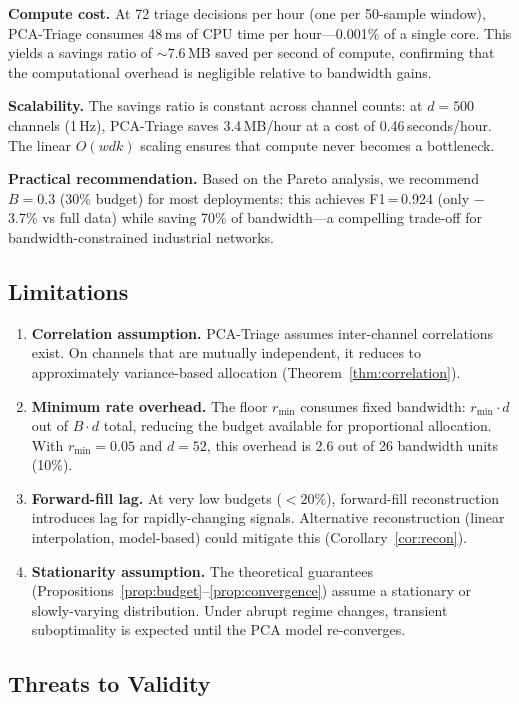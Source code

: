\documentclass[journal]{IEEEtran}
\begin{document}
\textbf{Compute cost.} At 72 triage decisions per hour (one per 50-sample window), PCA-Triage consumes 48\,ms of CPU time per hour---0.001\% of a single core. This yields a savings ratio of ${\sim}7.6$\,MB saved per second of compute, confirming that the computational overhead is negligible relative to bandwidth gains.

\textbf{Scalability.} The savings ratio is constant across channel counts: at $d{=}500$ channels (1\,Hz), PCA-Triage saves 3.4\,MB/hour at a cost of 0.46\,seconds/hour. The linear $O(wdk)$ scaling ensures that compute never becomes a bottleneck.

\textbf{Practical recommendation.} Based on the Pareto analysis, we recommend $B{=}0.3$ (30\% budget) for most deployments: this achieves F1\,=\,0.924 (only $-$3.7\% vs full data) while saving 70\% of bandwidth---a compelling trade-off for bandwidth-constrained industrial networks.

\subsection{Limitations}

\begin{enumerate}[leftmargin=*]
\item \textbf{Correlation assumption.} PCA-Triage assumes inter-channel correlations exist. On channels that are mutually independent, it reduces to approximately variance-based allocation (Theorem~\ref{thm:correlation}).
\item \textbf{Minimum rate overhead.} The floor $r_{\min}$ consumes fixed bandwidth: $r_{\min} \cdot d$ out of $B \cdot d$ total, reducing the budget available for proportional allocation. With $r_{\min} = 0.05$ and $d = 52$, this overhead is 2.6 out of 26 bandwidth units (10\%).
\item \textbf{Forward-fill lag.} At very low budgets ($< 20\%$), forward-fill reconstruction introduces lag for rapidly-changing signals. Alternative reconstruction (linear interpolation, model-based) could mitigate this (Corollary~\ref{cor:recon}).
\item \textbf{Stationarity assumption.} The theoretical guarantees (Propositions~\ref{prop:budget}--\ref{prop:convergence}) assume a stationary or slowly-varying distribution. Under abrupt regime changes, transient suboptimality is expected until the PCA model re-converges.
\end{enumerate}

\subsection{Threats to Validity}
\end{document}
